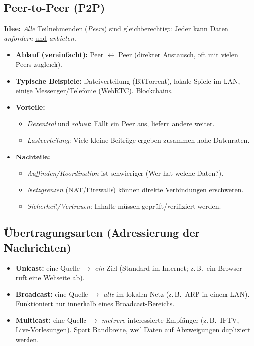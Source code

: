 \documentclass[../skript/main.tex]{subfiles}
\begin{document}
\subsection{Peer-to-Peer (P2P)}
\textbf{Idee:} \emph{Alle} Teilnehmenden (\emph{Peers}) sind gleichberechtigt: Jeder kann Daten \emph{anfordern} \underline{und} \emph{anbieten}.
\begin{itemize}
	\item \textbf{Ablauf (vereinfacht):} Peer \(\leftrightarrow\) Peer (direkter Austausch, oft mit vielen Peers zugleich).
	\item \textbf{Typische Beispiele:} Dateiverteilung (BitTorrent), lokale Spiele im LAN, einige Messenger/Telefonie (WebRTC), Blockchains.
	\item \textbf{Vorteile:}
	\begin{itemize}
		\item \emph{Dezentral} und \emph{robust}: Fällt ein Peer aus, liefern andere weiter.
		\item \emph{Lastverteilung}: Viele kleine Beiträge ergeben zusammen hohe Datenraten.
	\end{itemize}
	\item \textbf{Nachteile:}
	\begin{itemize}
		\item \emph{Auffinden/Koordination} ist schwieriger (Wer hat welche Daten?).
		\item \emph{Netzgrenzen} (NAT/Firewalls) können direkte Verbindungen erschweren.
		\item \emph{Sicherheit/Vertrauen}: Inhalte müssen geprüft/verifiziert werden.
	\end{itemize}
\end{itemize}


\subsection{Übertragungsarten (Adressierung der Nachrichten)}
\begin{itemize}
	\item \textbf{Unicast:} eine Quelle \(\rightarrow\) \emph{ein} Ziel (Standard im Internet; z.\,B.\ ein Browser ruft eine Webseite ab).
	\item \textbf{Broadcast:} eine Quelle \(\rightarrow\) \emph{alle} im lokalen Netz (z.\,B.\ ARP in einem LAN). Funktioniert nur innerhalb eines Broadcast-Bereichs.
	\item \textbf{Multicast:} eine Quelle \(\rightarrow\) \emph{mehrere} interessierte Empfänger (z.\,B.\ IPTV, Live-Vorlesungen). Spart Bandbreite, weil Daten auf Abzweigungen dupliziert werden.
\end{itemize}
\end{document}
